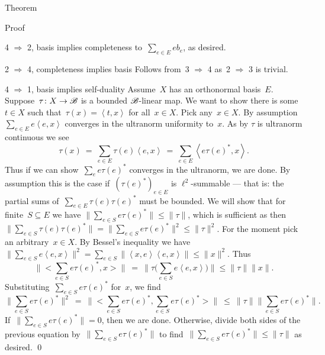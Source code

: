 \begin{parsec}
\begin{point}{Theorem}
\begin{point}{Proof}
\begin{point}{4 $\Rightarrow$ 2, basis implies completeness}
to~$\sum_{e \in E} e b_e$, as desired.
\end{point}
\begin{point}{2 $\Rightarrow$ 4, completeness implies basis}%
    Follows from~3 $\Rightarrow$ 4
        as~2 $\Rightarrow$ 3 is trivial.
\end{point}
\begin{point}{4 $\Rightarrow$ 1, basis implies self-duality}%
    Assume~$X$ has an orthonormal basis~$E$.
    Suppose~$\tau\colon X \to \mathscr{B}$ is a bounded $\mathscr{B}$-linear map.
    We want to show there is some~$t \in X$
    such that~$\tau(x) = \left<t,x\right>$ for all~$x \in X$.
    Pick any~$x \in X$.
    By assumption~$\sum_{e \in E} e  \left<e,x\right>$
        converges in the ultranorm uniformity to~$x$.
As by  $\tau$ is ultranorm continuous
        we see
        \begin{equation*}
            \tau(x) \ =\  \sum_{e \in E} \tau(e) \left<e,x\right>
                \ =\  \sum_{e \in E} \left<e \tau(e)^*,x\right>.
        \end{equation*}
    Thus if we can show~$\sum_e e \tau(e)^*$ converges in the ultranorm,
        we are done. By assumption this is
            the case if~$(\tau(e)^*)_{e \in E} $ is $\ell^2$-summable
            --- that is: the partial sums of~$\sum_{e \in E} \tau(e)\tau(e)^*$
                must be bounded.
        We will show
        that for finite~$S \subseteq E$
        we have
        $\|\sum_{e \in S} e \tau(e)^* \|\leq \|\tau\|$,
        which is sufficient as then~$ \| \sum_{e \in S}  \tau(e)\tau(e)^* \|
        =\|\sum_{e \in S} e \tau(e)^* \|^2  \leq \|\tau\|^2$.
For the moment pick an arbitrary~$x \in X$.
By Bessel's inequality
we have~$
\| \sum_{e\in S} e \left<e,x\right>\|^2
    = \sum_{e\in S} \|\left<x,e\right>\left<e,x\right>\|
    \leq \|x\|^2$.
Thus
    \begin{equation*}
        \bigl\|\bigl< \sum_{e \in S} e \tau(e)^*,x\bigr>\bigr\|
        \ =\  \bigl\| \tau \bigl(\sum_{e \in S} e\left<e,x\right>\bigr) \bigr\|
        \leq \|\tau\| \|x\|.
    \end{equation*}
Substituting~$\sum_{e \in S} e \tau(e)^*$ for~$x$, we find
\begin{equation*}
    \| \sum_{e\in S}e \tau(e)^*\|^2 \ =\ 
    \bigl\|\bigl< \sum_{e \in S} e \tau(e)^*,\sum_{e \in S} e\tau(e)^*\bigr>\bigr\|
    \ \leq \ \|\tau\| \bigl\| \sum_{e\in S}e \tau(e)^*\bigr\|.
\end{equation*}
If~$ \| \sum_{e\in S}e \tau(e)^*\| = 0$,
then we are done.
Otherwise, divide both sides of the previous equation
by~$ \| \sum_{e\in S}e \tau(e)^*\|$
to find~$ \| \sum_{e\in S}e \tau(e)^*\| \leq \|\tau\|$ as desired. \qed
\end{point}
\end{point}
\end{point}
\end{parsec}

